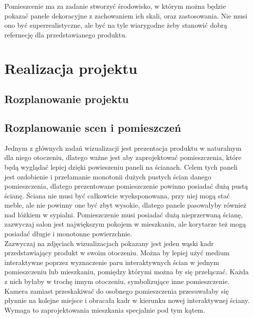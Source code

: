 \documentclass{article} %
\begin{document}
        Pomieszcenie ma za zadanie stworzyć środowisko, w którym można będzie pokazać panele dekoracyjne z zachowaniem ich skali, oraz zastosowania. Nie musi ono być superrealistyczne, ale być na tyle wiarygodne żeby stanowić dobrą refernecję dla przedstawianego produktu.
        \\
        
    
        
\section{Realizacja projektu}
    \subsection{Rozplanowanie projektu}
    
    
    \subsection{Rozplanowanie scen i pomieszczeń}
        Jednym z głównych zadań wizualizacji jest prezentacja produktu w naturalnym dla niego otoczeniu, dlatego ważne jest aby zaprojektować pomieszczenia, które będą wyglądać lepiej dzięki powieszeniu paneli na ścianach. Celem tych paneli jest ozdobienie i przełamanie monotonii dużych pustych ścian danego pomieszczenia, dlatego prezentowane pomieszczenie powinno posiadać dużą pustą ścianę. Ściana nie musi być całkowicie wyeksponowana, przy niej mogą stać meble, ale nie powinny one być zbyt wysokie, dlatego panele pasowałyby również nad łóżkiem w sypialni. Pomieszczenie musi posiadać dużą nieprzerwaną ścianę, zazwyczaj salon jest największym pokojem w mieszkaniu, ale korytarze też mogą posiadać długie i monotonne powierzchnie.
        \\
        
        Zazwyczaj na zdjęciach wizualizacjach pokazany jest jeden wąski kadr przedstawiający produkt w swoim otoczeniu. Można by lepiej użyć medium interaktywne poprzez wyznaczenie paru interaktywnych ścian w jednym pomieszczeniu lub mieszkaniu, pomiędzy którymi można by się przełączać. Każda z nich byłaby w trochę innym otoczeniu, symbolizujące inne pomieszczenie. Kamera zamiast przeskakiwać do osobnego pomieszczenia przesuwałaby się płynnie na kolejne miejsce i obracała kadr w kierunku nowej interaktywnej ściany. Wymaga to zaprojektowania mieszkania specjalnie pod tym kątem.
        \\
        
\end{document}
